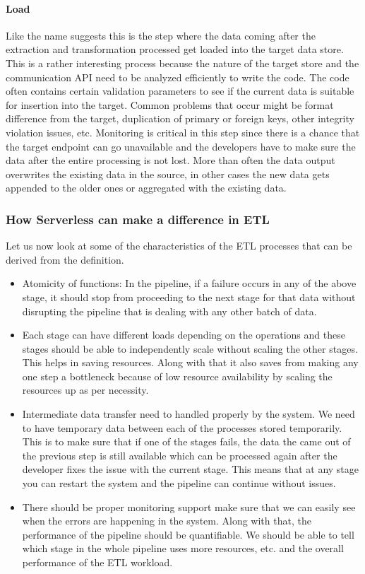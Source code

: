 \documentclass[12pt,titlepage]{article}
\begin{document}
\paragraph{Load}
\label{sec:orge48cb99}
Like the name suggests this is the step where the data coming after the
extraction and transformation processed get loaded into the target data store.
This is a rather interesting process because the nature of the target store and
the communication API need to be analyzed efficiently to write the code. The
code often contains certain validation parameters to see if the current data is
suitable for insertion into the target. Common problems that occur might be
format difference from the target, duplication of primary or foreign keys, other
integrity violation issues, etc. Monitoring is critical in this step since there
is a chance that the target endpoint can go unavailable and the developers have
to make sure the data after the entire processing is not lost. More than often
the data output overwrites the existing data in the source, in other cases the
new data gets appended to the older ones or aggregated with the existing data.

\subsubsection{How Serverless can make a difference in ETL}
\label{sec:orgb76abf2}
Let us now look at some of the characteristics of the ETL processes that can be
derived from the definition.
\begin{itemize}
\item Atomicity of functions: In the pipeline, if a failure occurs in any of the above stage, it should stop
from proceeding to the next stage for that data without disrupting the
pipeline that is dealing with any other batch of data.
\item Each stage can have different loads depending on the operations and these
stages should be able to independently scale without scaling the other stages.
This helps in saving resources. Along with that it also saves from making any
one step a bottleneck because of low resource availability by scaling the
resources up as per necessity.
\item Intermediate data transfer need to handled properly by the system. We need to
have temporary data between each of the processes stored temporarily. This is
to make sure that if one of the stages fails, the data the came out of the
previous step is still available which can be processed again after the
developer fixes the issue with the current stage. This means that at any stage
you can restart the system and the pipeline can continue without issues.
\item There should be proper monitoring support make sure that we can easily see
when the errors are happening in the system. Along with that, the performance
of the pipeline should be quantifiable. We should be able to tell which stage
in the whole pipeline uses more resources, etc. and the overall performance of
the ETL workload.
\end{itemize}
\end{document}
